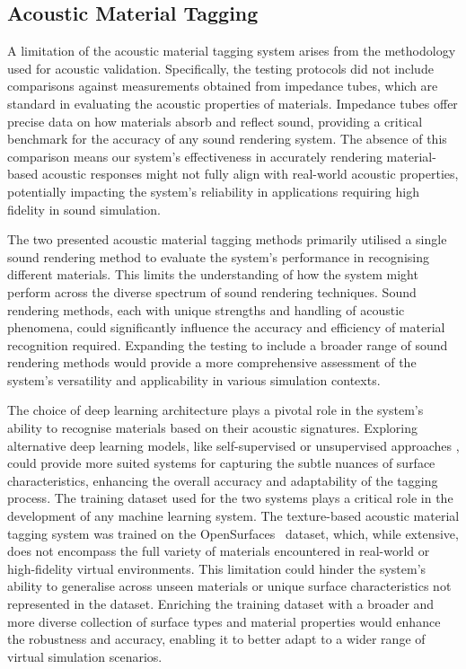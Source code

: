 \subsection{Acoustic Material Tagging}
A limitation of the acoustic material tagging system arises from the methodology used for acoustic validation. Specifically, the testing protocols did not include comparisons against measurements obtained from impedance tubes, which are standard in evaluating the acoustic properties of materials. Impedance tubes offer precise data on how materials absorb and reflect sound, providing a critical benchmark for the accuracy of any sound rendering system. The absence of this comparison means our system's effectiveness in accurately rendering material-based acoustic responses might not fully align with real-world acoustic properties, potentially impacting the system's reliability in applications requiring high fidelity in sound simulation.\par
The two presented acoustic material tagging methods primarily utilised a single sound rendering method to evaluate the system's performance in recognising different materials. This limits the understanding of how the system might perform across the diverse spectrum of sound rendering techniques. Sound rendering methods, each with unique strengths and handling of acoustic phenomena, could significantly influence the accuracy and efficiency of material recognition required. Expanding the testing to include a broader range of sound rendering methods would provide a more comprehensive assessment of the system's versatility and applicability in various simulation contexts.\par
The choice of deep learning architecture plays a pivotal role in the system's ability to recognise materials based on their acoustic signatures. Exploring alternative deep learning models, like self-supervised or unsupervised approaches \citep{gaur2019superpixel}, could provide more suited systems for capturing the subtle nuances of surface characteristics, enhancing the overall accuracy and adaptability of the tagging process. 
The training dataset used for the two systems plays a critical role in the development of any machine learning system. The texture-based acoustic material tagging system was trained on the OpenSurfaces~\citep{bell2013opensurfaces} dataset, which, while extensive, does not encompass the full variety of materials encountered in real-world or high-fidelity virtual environments. This limitation could hinder the system's ability to generalise across unseen materials or unique surface characteristics not represented in the dataset. Enriching the training dataset with a broader and more diverse collection of surface types and material properties would enhance the robustness and accuracy, enabling it to better adapt to a wider range of virtual simulation scenarios.

